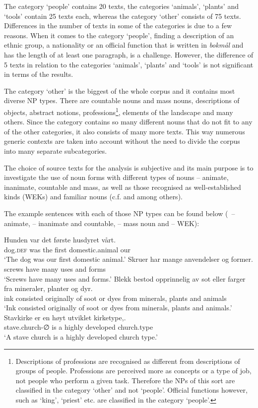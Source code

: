 \documentclass[output=paper]{langsci/langscibook}
\begin{document}
The category `people' contains 20 texts, the categories `animals', `plants' and `tools' contain 25 texts each, whereas the category `other' consists of 75 texts. Differences in the number of texts in some of the categories is due to a few reasons. When it comes to the category `people', finding a description of an ethnic group, a nationality or an official function that is written in \textit{bokmål} and has the length of at least one paragraph, is a challenge. However, the difference of 5 texts in relation to the categories `animals', `plants' and `tools' is not significant in terms of the results.

The category `other' is the biggest of the whole corpus and it contains most diverse NP types. There are countable nouns and mass nouns, descriptions of objects, abstract notions, professions\footnote{Descriptions of professions are recognised as different from descriptions of groups of people. Professions are perceived more as concepts or a type of job, not people who perform a given task. Therefore the NPs of this sort are classified in the category `other' and not `people'. Official functions however, such as `king', `priest' etc. are classified in the category `people'.}, elements of the landscape and many others. Since the category contains so many different nouns that do not fit to any of the other categories, it also consists of many more texts. This way numerous generic contexts are taken into account without the need to divide the corpus into many separate subcategories.\largerpage

The choice of source texts for the analysis is subjective and its main purpose is to investigate the use of noun forms with different types of nouns -- animate, inanimate, countable and mass, as well as those recognised as well-established kinds (WEKs) and familiar nouns (c.f. \citealp{GenBook1995} and \citealp{Borthen2007} among others). 

The example sentences with each of those NP types can be found below (~-- animate,  -- inanimate and countable,  -- mass noun and  -- WEK):

\ea\label{ex:animate}
	\gll Hunden var det første husdyret vårt. \\
		 dog.\textsc{def} was the first domestic.animal our \\
	\glt `The dog was our first domestic animal.'
\ex\label{ex:inanimate_countable}
	\gll Skruer har mange anvendelser og former. \\
		 screws have many uses and forms \\
	\glt `Screws have many uses and forms.'
\ex\label{ex:mass}
	\gll Blekk bestod opprinnelig av sot eller farger fra mineraler, planter og dyr. \\
		 ink consisted originally of soot or dyes from minerals, plants and animals \\
	\glt `Ink consisted originally of soot or dyes from minerals, plants and animals.'
\ex\label{ex:WEK}
	\gll Stavkirke er en høyt utviklet kirketype,. \\
		 stave.church-∅ is a highly developed church.type \\
	\glt `A stave church is a highly developed church type.'
\z
\end{document}
